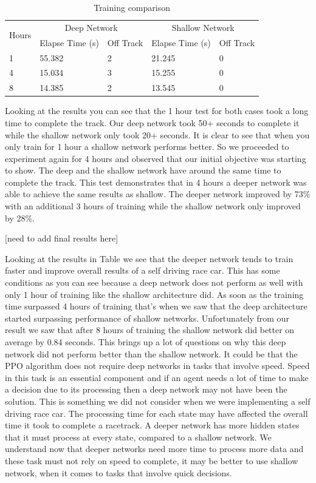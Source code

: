 \documentclass[journal]{IEEEtran}
\begin{document}
\begin{table}[t]
\centering
\caption{Training comparison}
\begin{tabular}{ |p{1cm}|p{2cm}|p{1cm}|p{2cm}|p{1cm}| }
\hline
 \multirow{2}{*}{Hours} & \multicolumn{2}{|c|}{Deep Network} & \multicolumn{2}{|c|}{Shallow Network} \\
\cline{2-5}
 & Elapse Time (s) & Off Track &  Elapse Time (s) & Off Track  \\
\hline
\multirow{1}{4em}{1} & 55.382 & 2 & 21.245 & 0 \\ 
 \hline
\multirow{1}{4em}{4} & 15.034& 3 & 15.255 & 0 \\ 
 \hline
\multirow{1}{4em}{8} & 14.385& 2 & 13.545 & 0 \\ 
 \hline
\end{tabular}
\label{mainTest}
\end{table}

Looking at the results you can see that the 1 hour test for both cases took a long time to complete the track.  Our deep network took 50+ seconds to complete it while the shallow network only took 20+ seconds.  It is clear to see that when you only train for 1 hour a shallow network performs better.  So we proceeded to experiment again for 4 hours and observed that our initial objective was starting to show.  The deep and the shallow network have around the same time to complete the track.  This test demonstrates that in 4 hours a deeper network was able to achieve the same results as shallow.  The deeper network improved by 73\% with an additional 3 hours of training while the shallow network only improved by 28\%.  

[need to add final results here]

Looking at the results in Table \label{mainTest} we see that the deeper network tends to train faster and improve overall results of a self driving race car.  This has some conditions as you can see because a deep network does not perform as well with only 1 hour of training like the shallow architecture did.  As soon as the training time surpassed 4 hours of training that's when we saw that the deep architecture started surpassing performance of shallow networks.  Unfortunately from our result we saw that after 8 hours of training the shallow network did better on average by 0.84 seconds.  This brings up a lot of questions on why this deep network did not perform better than the shallow network.  It could be that the PPO algorithm does not require deep networks in tasks that involve speed.  Speed in this task is an essential component and if an agent needs a lot of time to make a decision due to its processing then a deep network may not have been the solution.  This is something we did not consider when we were implementing a self driving race car.  The processing time for each state may have affected the overall time it took to complete a racetrack.  A deeper network has more hidden states that it must process at every state, compared to a shallow network.  We understand now that deeper networks need more time to process more data and these task must not rely on speed to complete, it may be better to use shallow network, when it comes to tasks that involve quick decisions.
\end{document}
